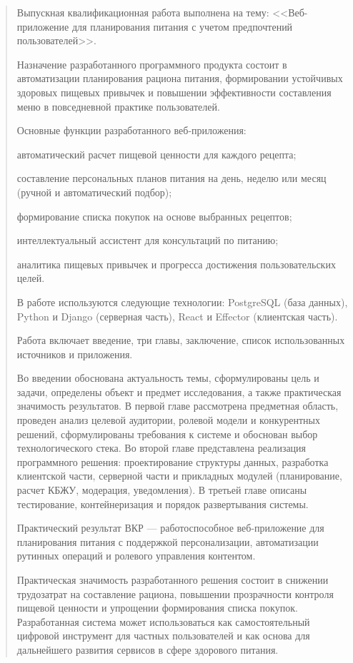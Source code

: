 \begin{abstract}
\thispagestyle{empty}

Выпускная квалификационная работа выполнена на тему: <<Веб-приложение для планирования питания с учетом предпочтений пользователей>>.

Назначение разработанного программного продукта состоит в автоматизации планирования рациона питания, формировании устойчивых здоровых пищевых привычек и повышении эффективности составления меню в повседневной практике пользователей.

Основные функции разработанного веб-приложения:
\begin{compactlist}
  \item автоматический расчет пищевой ценности для каждого рецепта;
  \item составление персональных планов питания на день, неделю или месяц (ручной и автоматический подбор);
  \item формирование списка покупок на основе выбранных рецептов;
  \item интеллектуальный ассистент для консультаций по питанию;
  \item аналитика пищевых привычек и прогресса достижения пользовательских целей.
\end{compactlist}

В работе используются следующие технологии: PostgreSQL (база данных), Python и Django (серверная часть), React и Effector (клиентская часть).

Работа включает введение, три главы, заключение, список использованных источников и приложения.

Во введении обоснована актуальность темы, сформулированы цель и задачи, определены объект и предмет исследования, а также практическая значимость результатов. В первой главе рассмотрена предметная область, проведен анализ целевой аудитории, ролевой модели и конкурентных решений, сформулированы требования к системе и обоснован выбор технологического стека. Во второй главе представлена реализация программного решения: проектирование структуры данных, разработка клиентской части, серверной части и прикладных модулей (планирование, расчет КБЖУ, модерация, уведомления). В третьей главе описаны тестирование, контейнеризация и порядок развертывания системы.

Практический результат ВКР --- работоспособное веб-приложение для планирования питания с поддержкой персонализации, автоматизации рутинных операций и ролевого управления контентом.

Практическая значимость разработанного решения состоит в снижении трудозатрат на составление рациона, повышении прозрачности контроля пищевой ценности и упрощении формирования списка покупок. Разработанная система может использоваться как самостоятельный цифровой инструмент для частных пользователей и как основа для дальнейшего развития сервисов в сфере здорового питания.
\end{abstract}